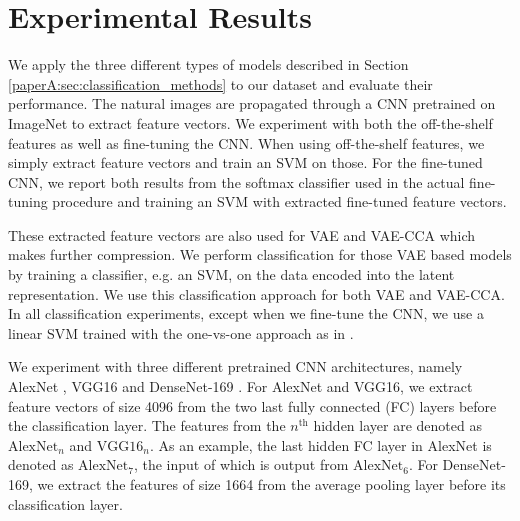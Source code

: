\section{Experimental Results}\label{paperA:sec:experimental_results}

We apply the three different types of models described in Section \ref{paperA:sec:classification_methods} to our dataset and evaluate their performance. The natural images are propagated through a CNN pretrained on ImageNet to extract feature vectors. We experiment with both the off-the-shelf features as well as fine-tuning the CNN. When using off-the-shelf features, we simply extract feature vectors and train an SVM on those. For the fine-tuned CNN, we report both results from the softmax classifier used in the actual fine-tuning procedure and training an SVM with extracted fine-tuned feature vectors.  

These extracted feature vectors are also used for VAE and VAE-CCA which makes further compression. We perform classification for those VAE based models by training a classifier, e.g. an SVM, on the data encoded into the latent representation. We use this classification approach for both VAE and VAE-CCA. In all classification experiments, except when we fine-tune the CNN, we use a linear SVM trained with the one-vs-one approach as in .

We experiment with three different pretrained CNN architectures, namely AlexNet , VGG16  and DenseNet-169 . For AlexNet and VGG16, we extract feature vectors of size 4096 from the two last fully connected (FC) layers before the classification layer. The features from the $n^{\text{th}}$ hidden layer are denoted as $\text{AlexNet}_{n}$ and $\text{VGG16}_{n}$. As an example, the last hidden FC layer in AlexNet is denoted as $\text{AlexNet}_{7}$, the input of which is output from $\text{AlexNet}_{6}$. For DenseNet-169, we extract the features of size 1664 from the average pooling layer before its classification layer.

